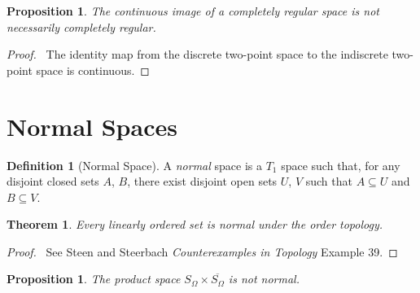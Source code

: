 \documentclass{report}
\let\qed\relax
\newtheorem{prop}[lm]{Proposition}
\newtheorem{thm}[lm]{Theorem}
\theoremstyle{definition}
\newtheorem{df}[lm]{Definition}
\begin{document}
 \begin{prop}
   The continuous image of a completely regular space is not necessarily completely regular.
 \end{prop}

 \begin{proof}
   \pf\ The identity map from the discrete two-point space to the indiscrete two-point space is continuous. \qed
 \end{proof}

  \section{Normal Spaces}

    \begin{df}[Normal Space]
    A \emph{normal} space is a $T_1$ space such that, for any disjoint closed
sets $A$, $B$, there exist disjoint open sets $U$, $V$ such that $A \subseteq
U$ and $B \subseteq V$.
  \end{df}

    \begin{thm}
   Every linearly ordered set is normal under the order topology.
  \end{thm}

  \begin{proof}
    \pf\ See Steen and Steerbach \emph{Counterexamples in Topology} Example 39.
\qed
  \end{proof}

    \begin{prop}
      \label{prop:topology:normal:S_Omega_times_S_Omega}
    The product space $S_\Omega \times \overline{S_\Omega}$ is not normal.
  \end{prop}
\end{document}

